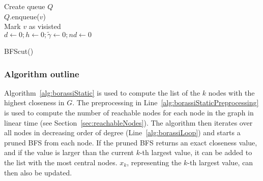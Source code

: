 \begin{algorithm2e}[h!]
 \label{alg:bfsCutStatic}
 Create queue $Q$ \\
 $Q$.enqueue($v$) \\
 Mark $v$ as visisted \\
 $d \gets 0; h \gets 0; \widetilde{\gamma} \gets 0; nd \gets 0$ \\
 
 
 \caption{BFScut()}
\end{algorithm2e}

\subsubsection{Algorithm outline}
Algorithm~\ref{alg:borassiStatic} is used to compute the list of the $k$ nodes with the highest closeness in $G$. The preprocessing in Line~\ref{alg:borassiStaticPreprocessing} is used to compute the number of reachable nodes for each node in the graph in linear time (see Section~\ref{sec:reachableNodes}). The algorithm then iterates over all nodes in decreasing order of degree (Line~\ref{alg:borassiLoop}) and starts a pruned BFS from each node. If the pruned BFS returns an exact closeness value, and if the value is larger than the current $k$-th largest value, it can be added to the list with the most central nodes. $x_k$, representing the $k$-th largest value, can then also be updated.


